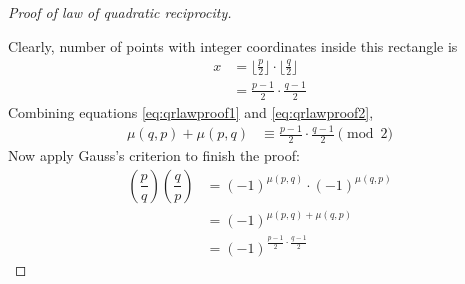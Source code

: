 \documentclass{subfile}
\begin{document}
\begin{proof}[Proof of law of quadratic reciprocity]
\begin{center}
	\end{center}
	Clearly, number of points with integer coordinates inside this rectangle is
	\begin{align}\label{eq:qrlawproof2}
		x
			& =\Big\lfloor\frac{p}{2} \Big\rfloor \cdot \Big\lfloor\frac{q}{2} \Big\rfloor\\
			& = \frac{p-1}{2}\cdot\frac{q-1}{2}
	\end{align}
	Combining equations \eqref{eq:qrlawproof1} and \eqref{eq:qrlawproof2},
	\begin{align*}
		\mu(q,p)+\mu(p,q)
			& \equiv \frac{p-1}{2}\cdot\frac{q-1}{2} \pmod 2
	\end{align*}
	Now apply Gauss's criterion to finish the proof:
	\begin{align*}
	\left(\dfrac{p}{q}\right)\left(\dfrac{q}{p}\right)
		&=(-1)^{\mu(p,q)} \cdot (-1)^{\mu(q,p)} \\
		&= (-1)^{\mu(p,q)+\mu(q,p)}\\
		&=(-1)^{\frac{p-1}{2}\cdot\frac{q-1}{2}}
	\end{align*}
\end{proof}
\end{document}
